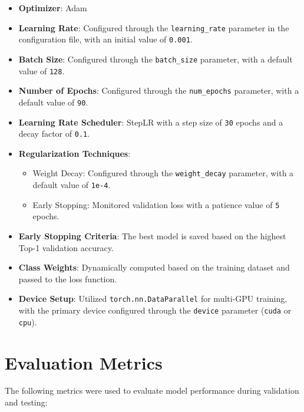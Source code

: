 \begin{itemize}
    \item \textbf{Optimizer}: Adam
    \item \textbf{Learning Rate}: Configured through the \texttt{learning\_rate} parameter in the configuration file, with an initial value of \texttt{0.001}.
    \item \textbf{Batch Size}: Configured through the \texttt{batch\_size} parameter, with a default value of \texttt{128}.
    \item \textbf{Number of Epochs}: Configured through the \texttt{num\_epochs} parameter, with a default value of \texttt{90}.
    \item \textbf{Learning Rate Scheduler}: StepLR with a step size of \texttt{30} epochs and a decay factor of \texttt{0.1}.
    \item \textbf{Regularization Techniques}:
    \begin{itemize}
        \item Weight Decay: Configured through the \texttt{weight\_decay} parameter, with a default value of \texttt{1e-4}.
        \item Early Stopping: Monitored validation loss with a patience value of \texttt{5} epochs.
    \end{itemize}
    \item \textbf{Early Stopping Criteria}: The best model is saved based on the highest Top-1 validation accuracy.
    \item \textbf{Class Weights}: Dynamically computed based on the training dataset and passed to the loss function.
    \item \textbf{Device Setup}: Utilized \texttt{torch.nn.DataParallel} for multi-GPU training, with the primary device configured through the \texttt{device} parameter (\texttt{cuda} or \texttt{cpu}).
\end{itemize}


\section{Evaluation Metrics}
The following metrics were used to evaluate model performance during validation and testing:

